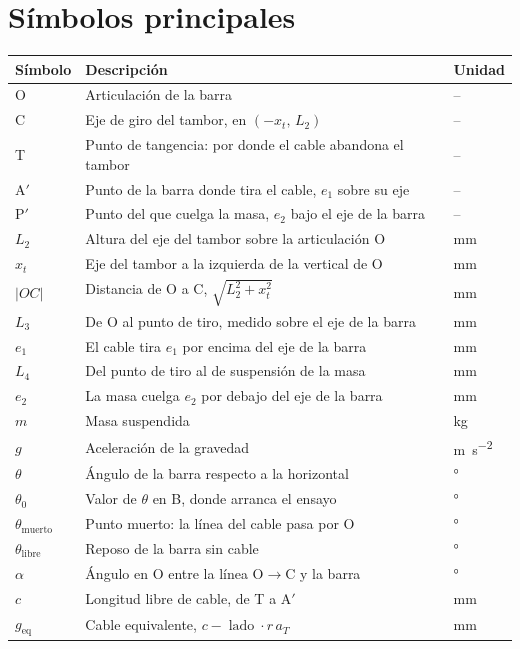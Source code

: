 \section*{Símbolos principales}
\begin{longtable}{@{}L{0.17\textwidth}L{0.55\textwidth}L{0.16\textwidth}@{}}
\toprule
\textbf{Símbolo} & \textbf{Descripción} & \textbf{Unidad} \\
\midrule
\endhead
O         & Articulación de la barra & -- \\
C         & Eje de giro del tambor, en $(-x_t,\,L_2)$ & -- \\
T         & Punto de tangencia: por donde el cable abandona el tambor & -- \\
A$'$      & Punto de la barra donde tira el cable, $e_1$ sobre su eje & -- \\
P$'$      & Punto del que cuelga la masa, $e_2$ bajo el eje de la barra & -- \\
$L_2$     & Altura del eje del tambor sobre la articulación O & mm \\
$x_t$     & Eje del tambor a la izquierda de la vertical de O & mm \\
$|OC|$    & Distancia de O a C, $\sqrt{L_2^2+x_t^2}$ & mm \\
$L_3$     & De O al punto de tiro, medido sobre el eje de la barra & mm \\
$e_1$     & El cable tira $e_1$ por encima del eje de la barra & mm \\
$L_4$     & Del punto de tiro al de suspensión de la masa & mm \\
$e_2$     & La masa cuelga $e_2$ por debajo del eje de la barra & mm \\
$m$       & Masa suspendida & kg \\
$g$       & Aceleración de la gravedad & \si{\metre\per\second\squared} \\
$\theta$  & Ángulo de la barra respecto a la horizontal & ° \\
$\theta_0$& Valor de $\theta$ en B, donde arranca el ensayo & ° \\
$\theta_{\text{muerto}}$ & Punto muerto: la línea del cable pasa por O & ° \\
$\theta_{\text{libre}}$  & Reposo de la barra sin cable & ° \\
$\alpha$  & Ángulo en O entre la línea O$\to$C y la barra & ° \\
$c$       & Longitud libre de cable, de T a A$'$ & mm \\
$g_{\text{eq}}$ & Cable equivalente, $c-\operatorname{lado}\cdot r\,a_T$ & mm \\

\end{longtable}

